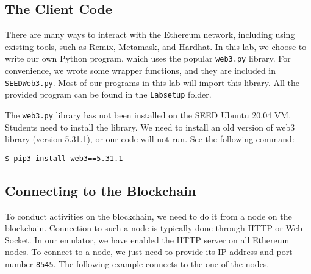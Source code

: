 \subsection{The Client Code} 

There are many ways to interact with the Ethereum network,
including using existing tools, such as Remix, Metamask, and Hardhat.
In this lab, we choose to write our own Python program, 
which uses the popular \texttt{web3.py} library. 
For convenience, we wrote some wrapper functions, and 
they are included in \texttt{SEEDWeb3.py}.  Most of our
programs in this lab will import this library. 
All the provided program can be found in the
\texttt{Labsetup} folder.  


The \texttt{web3.py} library has not been installed on the SEED Ubuntu 20.04 VM. 
Students need to install the library. 
We need to install an old version of web3 library (version 5.31.1), 
or our code will not run. See the following command: 

\begin{lstlisting}
$ pip3 install web3==5.31.1
\end{lstlisting}





\subsection{Connecting to the Blockchain} 
\label{sec:sub:ports}



To conduct activities on the blockchain, we need to 
do it from a node on the blockchain. Connection to
such a node is typically done through HTTP or Web Socket. 
In our emulator, we have enabled the HTTP server on
all Ethereum nodes. 
To connect to a node, we just need to provide its IP address 
and port number \texttt{8545}. 
The following example connects to the one of the nodes.

